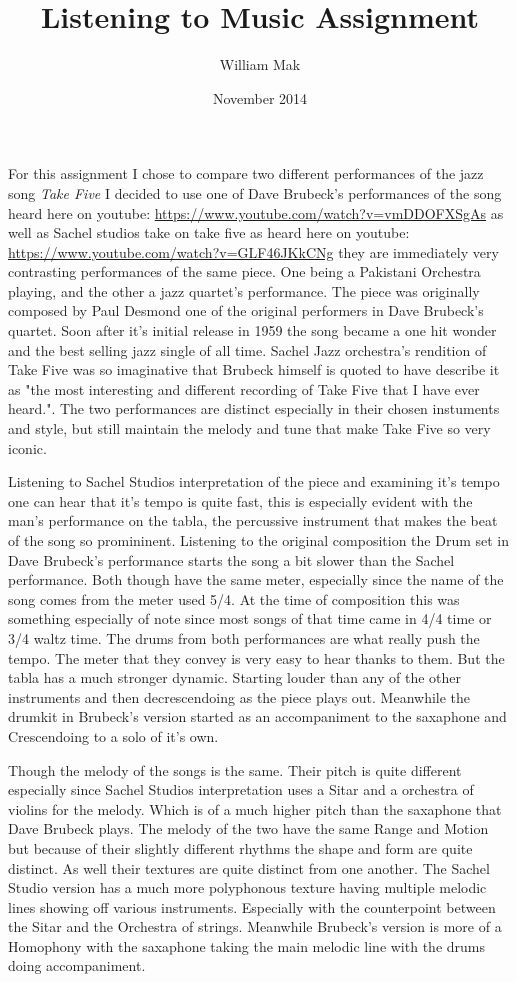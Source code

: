 \documentclass{article}
\title{Listening to Music Assignment}
\author{William Mak}
\date{November 2014}
\begin{document}
\maketitle

For this assignment I chose to compare two different performances of the jazz 
song {\it Take Five} I decided to use one of Dave Brubeck's performances of the 
song heard here on youtube:
\url{https://www.youtube.com/watch?v=vmDDOFXSgAs}
as well as Sachel studios take on take five as heard here on youtube:
\url{https://www.youtube.com/watch?v=GLF46JKkCNg}
they are immediately very contrasting performances of the same piece. One being
a Pakistani Orchestra playing, and the other a jazz quartet's performance. The
piece was originally composed by Paul Desmond one of the original performers in
Dave Brubeck's quartet. Soon after it's initial release in 1959 the song became
a one hit wonder and the best selling jazz single of all time. Sachel Jazz
orchestra's rendition of Take Five was so imaginative that Brubeck himself is
quoted to have describe it as "the most interesting and different recording of
Take Five that I have ever heard.". The two performances are distinct especially
in their chosen instuments and style, but still maintain the melody and tune
that make Take Five so very iconic.

Listening to Sachel Studios interpretation of the piece and examining it's tempo
one can hear that it's tempo is quite fast, this is especially evident with the
man's performance on the tabla, the percussive instrument that makes the beat of
the song so promininent. Listening to the original composition the Drum set in
Dave Brubeck's performance starts the song a bit slower than the Sachel
performance. Both though have the same meter, especially since the name of the
song comes from the meter used 5/4. At the time of composition this was
something especially of note since most songs of that time came in 4/4 time or
3/4 waltz time. The drums from both performances are what really push the tempo.
The meter that they convey is very easy to hear thanks to them. But the tabla
has a much stronger dynamic. Starting louder than any of the other instruments
and then decrescendoing as the piece plays out. Meanwhile the drumkit in
Brubeck's version started as an accompaniment to the saxaphone and Crescendoing
to a solo of it's own.

Though the melody of the songs is the same. Their pitch is quite different
especially since Sachel Studios interpretation uses a Sitar and a orchestra of
violins for the melody. Which is of a much higher pitch than the saxaphone that
Dave Brubeck plays. The melody of the two have the same Range and Motion but
because of their slightly different rhythms the shape and form are quite
distinct. As well their textures are quite distinct from one another. The Sachel
Studio version has a much more polyphonous texture having multiple melodic lines
showing off various instruments. Especially with the counterpoint between the
Sitar and the Orchestra of strings. Meanwhile Brubeck's version is more of a
Homophony with the saxaphone taking the main melodic line with the drums doing
accompaniment. 
\end{document}
